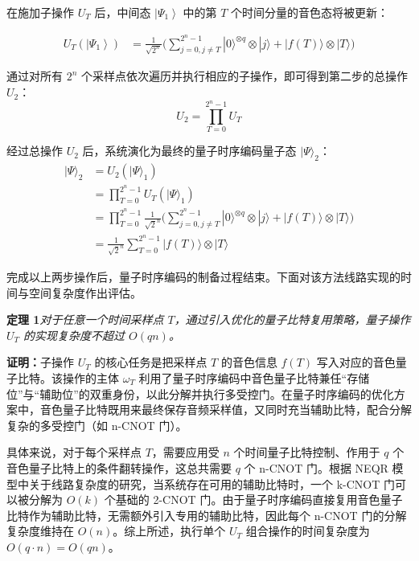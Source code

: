 在施加子操作 $U_T$ 后，中间态 $\left|\Psi_1\right\rangle$ 中的第 $T$ 个时间分量的音色态将被更新：

\begin{equation}
	\begin{aligned}
		U_T\left(\left|\Psi_1\right\rangle\right) &= \frac{1}{\sqrt{2^n}} \Bigg( \sum_{j=0, j \neq T}^{2^n-1}|0\rangle^{\otimes q} \otimes |j\rangle + |f(T)\rangle \otimes |T\rangle \Bigg)
	\end{aligned}
	\label{eq:ut_psi1}
\end{equation}

通过对所有 $2^n$ 个采样点依次遍历并执行相应的子操作，即可得到第二步的总操作 $U_2$：
\begin{equation}
	U_2=\prod_{T=0}^{2^n-1} U_T
	\label{eq:u2}
\end{equation}

经过总操作 $U_2$ 后，系统演化为最终的量子时序编码量子态 $|\Psi\rangle_2$：
\begin{equation}
	\begin{aligned}
		|\Psi\rangle_2 &= U_2\left(|\Psi\rangle_1\right) \\
		&= \prod_{T=0}^{2^n-1} U_T\left(|\Psi\rangle_1\right) \\
		&= \prod_{T=0}^{2^n-1} \frac{1}{\sqrt{2}^n} \Bigg( \sum_{j=0, j \neq T}^{2^n-1}|0\rangle^{\otimes q} \otimes |j\rangle + |f(T)\rangle \otimes |T\rangle \Bigg) \\
		&= \frac{1}{\sqrt{2}^n} \sum_{T=0}^{2^n-1}|f(T)\rangle \otimes |T\rangle
	\end{aligned}
	\label{eq:psi_2}
\end{equation}

完成以上两步操作后，量子时序编码的制备过程结束。下面对该方法线路实现的时间与空间复杂度作出评估。

\textbf{定理 1}\textit{对于任意一个时间采样点 $T$，通过引入优化的量子比特复用策略，量子操作 $U_T$ 的实现复杂度不超过 $O(qn)$。}

\textbf{证明：}子操作 $U_T$ 的核心任务是把采样点 $T$ 的音色信息 $f(T)$ 写入对应的音色量子比特。该操作的主体 $\omega_T$ 利用了量子时序编码中音色量子比特兼任“存储位”与“辅助位”的双重身份，以此分解并执行多受控门。在量子时序编码的优化方案中，音色量子比特既用来最终保存音频采样值，又同时充当辅助比特，配合分解复杂的多受控门（如 n-CNOT 门）。

具体来说，对于每个采样点 $T$，需要应用受 $n$ 个时间量子比特控制、作用于 $q$ 个音色量子比特上的条件翻转操作，这总共需要 $q$ 个 n-CNOT 门。根据 NEQR 模型中关于线路复杂度的研究，当系统存在可用的辅助比特时，一个 k-CNOT 门可以被分解为 $O(k)$ 个基础的 2-CNOT 门。由于量子时序编码直接复用音色量子比特作为辅助比特，无需额外引入专用的辅助比特，因此每个 n-CNOT 门的分解复杂度维持在 $O(n)$。综上所述，执行单个 $U_T$ 组合操作的时间复杂度为 $O(q \cdot n) = O(qn)$。

